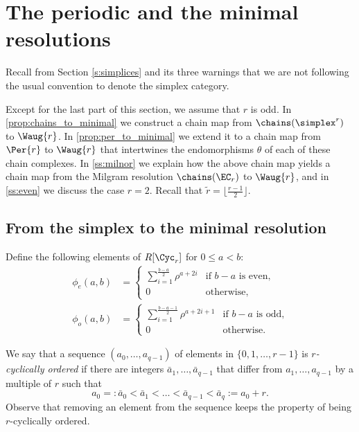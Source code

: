 
\section{The periodic and the minimal resolutions}\label{s:per_to_minimal}

\begin{warning}
Recall from Section \cref{s:simplices} and its three warnings that we are not following the usual convention to denote the simplex category.
\end{warning}

Except for the last part of this section, we assume that $r$ is odd. In \cref{prop:chains_to_minimal} we construct a chain map from $\chains(\simplex^{r})$ to $\Waug{r}$. In \cref{prop:per_to_minimal} we extend it to a chain map from $\Per{r}$ to $\Waug{r}$ that intertwines the endomorphisms $\theta$ of each of these chain complexes. In \cref{ss:milnor} we explain how the above chain map yields a chain map from the Milgram resolution $\chains(\EC_r)$ to $\Waug{r}$, and in \cref{ss:even} we discuss the case $r=2$. Recall that $\tilde{r} = \lfloor \frac{r-1}{2}\rfloor$.

\subsection{From the simplex to the minimal resolution}

Define the following elements of $R[\Cyc_r]$ for $0\leq a<b$:
\begin{align*}
	\phi_{e}(a,b) &= \begin{cases}
		\displaystyle \sum_{i=1}^{\frac{b-a}{2}} \rho^{a+2i} & \text{if $b-a$ is even,} \\
		0 & \text{otherwise,}
	\end{cases}
	\\
	\phi_{o}(a,b) &= \begin{cases}
		\displaystyle \sum_{i=1}^{\frac{b-a-1}{2}} \rho^{a+2i+1} & \text{if $b-a$ is odd,} \\
		0 & \text{otherwise.}
	\end{cases}
\end{align*}

We say that a sequence $(a_0,\dots, a_{q-1})$ of elements in $\{0, 1, \dots, r-1\}$ is \emph{$r$-cyclically ordered} if there are integers $\bar{a}_1,\dots,\bar{a}_{q-1}$ that differ from $a_1,\dots,a_{q-1}$ by a multiple of $r$ such that 
\[
a_0=:\bar{a}_0<\bar{a}_1<\dots<\bar{a}_{q-1}<\bar{a}_q:=a_0+r.
\]
Observe that removing an element from the sequence keeps the property of being $r$-cyclically ordered.

